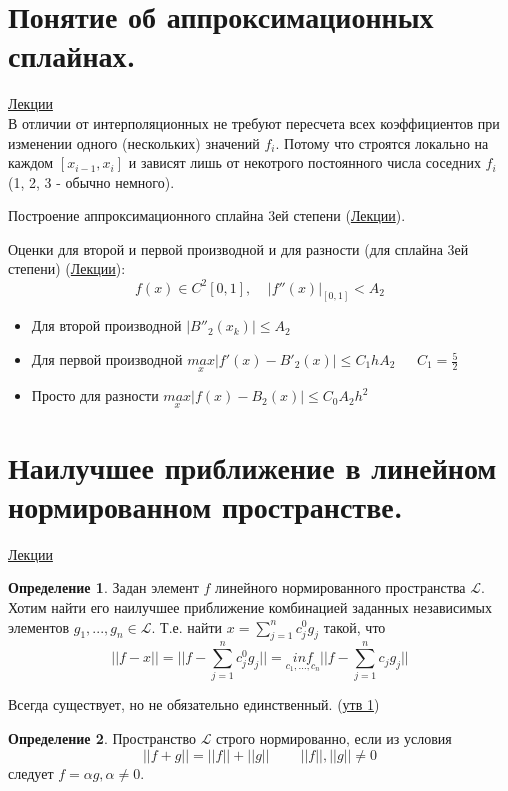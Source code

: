 \documentclass[specialist, subf, href, colorlinks=true, 12pt, times, mtpro, final]{disser}
\theoremstyle{definition}
\newtheorem{defn}{Определение}[section]
\begin{document}
\section {Понятие об аппроксимационных сплайнах.}
    \hyperlink {lects.25}{Лекции}\\
    В отличии от интерполяционных не требуют пересчета всех коэффициентов при изменении одного (нескольких) значений $f_i$. Потому что строятся локально на каждом $[x_{i-1}, x_i]$ и зависят лишь от некотрого постоянного числа соседних $f_i$ (1, 2, 3 - обычно немного).
    
    Построение аппроксимационного сплайна 3ей степени (\hyperlink {lects.25}{Лекции}).
    
    Оценки для второй и первой производной и для разности (для сплайна 3ей степени) (\hyperlink {lects.27}{Лекции}):
    $$
        f(x) \in C^2[0,1], \ \ \ \ \ |f''(x)|_{[0,1]} < A_2
    $$
    \begin{itemize}
        \item Для второй производной $|B''_2(x_k)| \le A_2$
        \item Для первой производной $\underset{x}{max}|f'(x)-B'_2(x)| \le C_1 h A_2 \ \ \ \ \ \  \ C_1 = \frac{5}{2}$
        \item Просто для разности $\underset{x}{max}|f(x)-B_2(x)| \le C_0 A_2 h^2$
            
    \end{itemize}
    
    
    

\section {Наилучшее приближение в линейном нормированном пространстве.}
    \hyperlink {lects.28}{Лекции}\\
    \begin{defn}
    Задан элемент $f$ линейного нормированного пространства $\mathcal{L}$. Хотим найти его наилучшее приближение комбинацией заданных независимых элементов $g_1, ..., g_n \in \mathcal{L}$. Т.е. найти $x = \sum\limits_{j = 1}^{n}c_j^0g_j$ такой, что
    $$
        ||f - x|| = ||f - \sum\limits_{j = 1}^{n}c_j^0g_j|| = \underset{c_1,...,c_n}{inf} ||f - \sum\limits_{j = 1}^{n}c_jg_j||
    $$
    \end{defn}

    Всегда существует, но не обязательно единственный. (\hyperlink {lects.28}{утв 1})
    
    \begin{defn}  
        Пространство $\mathcal{L}$ строго нормированно, если из условия
        $$
            ||f+g|| = ||f||+||g|| \ \ \ \ \ \ \ \ \ \ ||f||,||g|| \ne 0
        $$
        следует $f = \alpha g, \alpha \ne 0$.
    \end{defn}
\end{document}

